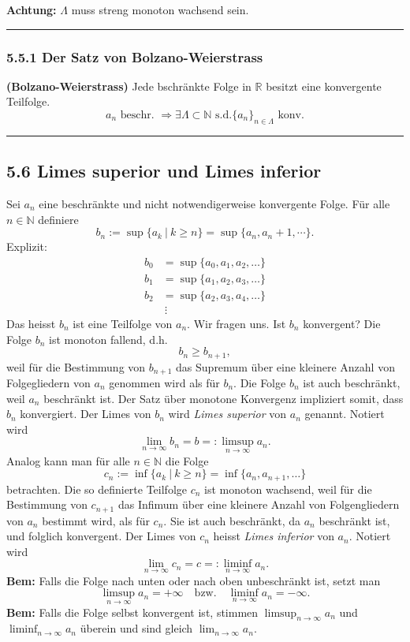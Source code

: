 \documentclass[a4paper,landscape,8pt]{extarticle}
\newcommand{\N}{\mathbb{N}}
\newcommand{\R}{\mathbb{R}}
\newcommand{\setsep}{\ \vert \ }
\newcommand{\sep}{\vspace{5pt}\noindent\hrule\vspace{5pt}}
\newcommand{\Bem}{\textbf{Bem: }}
\newcommand{\Achtung}{\textbf{Achtung: }}
\begin{document}
\begin{multicols*}{4}
\Achtung $\Lambda$ muss streng monoton wachsend sein.

\sep

\subsubsection{5.5.1 Der Satz von Bolzano-Weierstrass}

\Satz \textbf{(Bolzano-Weierstrass)} Jede bschränkte Folge in $\R$ besitzt eine
konvergente Teilfolge.
\[
a_n \text{ beschr. } \Longrightarrow \exists \Lambda \subset \N \text{ s.d.
}\{a_n\}_{n\in\Lambda} \text{ konv.}
\]

\sep

\subsection{5.6 Limes superior und Limes inferior}

\Def Sei $a_n$ eine beschränkte und nicht notwendigerweise konvergente Folge.
Für alle $n\in\N$ definiere
\[
b_n :=\sup \{a_k\setsep k\geq n\} = \sup\{a_n,a_n+1, \cdots\}.
\]
Explizit:
\begin{align*}
b_0 &= \sup\{a_0,a_1,a_2,\ldots\}\\
b_1 &= \sup\{a_1,a_2,a_3,\ldots\}\\
b_2 &= \sup\{a_2,a_3,a_4,\ldots\}\\
&\ \vdots
\end{align*}
Das heisst $b_n$ ist eine Teilfolge von $a_n$. Wir fragen uns. Ist $b_n$
konvergent? Die Folge $b_n$ ist monoton fallend, d.h.
\[
b_n \geq b_{n+1},
\]
weil für die Bestimmung von $b_{n+1}$ das Supremum über eine kleinere Anzahl von
Folgegliedern von $a_n$ genommen wird als für $b_n$. Die Folge $b_n$ ist auch
beschränkt, weil $a_n$ beschränkt ist. Der Satz über monotone Konvergenz
impliziert somit, dass $b_n$ konvergiert. Der Limes von $b_n$ wird \emph{Limes
superior} von $a_n$ genannt. Notiert wird
\[
\lim_{n\to\infty} b_n = b =: \limsup_{n\to\infty} a_n.
\]
Analog kann man für alle $n\in\N$ die Folge
\[
c_n:=\inf\{a_k\setsep k\geq n\} = \inf\{a_n, a_{n+1}, \ldots\}
\]
betrachten. Die so definierte Teilfolge $c_n$ ist monoton wachsend, weil für die
Bestimmung von $c_{n+1}$ das Infimum über eine kleinere Anzahl von
Folgengliedern von $a_n$ bestimmt wird, als für $c_n$. Sie ist auch beschränkt,
da $a_n$ beschränkt ist, und folglich konvergent. Der Limes von $c_n$ heisst
\emph{Limes inferior} von $a_n$. Notiert wird
\[
\lim_{n\to\infty}c_n= c =:\liminf_{n\to\infty} a_n.
\]
\Bem Falls die Folge nach unten oder nach oben unbeschränkt ist, setzt man
\[
\limsup_{n\to\infty} a_n = +\infty \quad \text{bzw.}\quad
\liminf_{n\to\infty} a_n = -\infty.
\]
\Bem Falls die Folge selbst konvergent ist, stimmen $\limsup_{n\to\infty} a_n$
und $\liminf_{n\to\infty} a_n$ überein und sind gleich $\lim_{n\to\infty} a_n$.


\end{multicols*}
\end{document}
